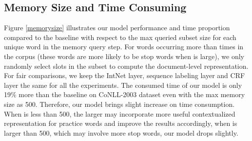 \documentclass[letterpaper]{article} \usepackage{aaai20}  \usepackage{times}  \usepackage{helvet} \usepackage{courier}  \usepackage[hyphens]{url}  \usepackage{graphicx} \urlstyle{rm} \def\UrlFont{\rm}  \usepackage{graphicx}  \frenchspacing  \setlength{\pdfpagewidth}{8.5in}  \setlength{\pdfpageheight}{11in}
\begin{document}
\begin{table}[t!] 
\centering
{}
\caption{Detailed results on the CoNLL-2003 dataset for IV, OOTV, OOEV, OOBV. }
\label{detail}
\end{table}

\subsection{Memory Size and Time Consuming} 
 Figure \ref{memorysize} illustrates our model performance and time proportion compared to the baseline with respect to the max queried subset size  for each unique word in the memory query step. For words occurring more than  times in the corpus (these words are more likely to be stop words when  is large), we only randomly select  slots in the subset to compute the  document-level representation.
For fair comparisons, we keep the IntNet layer, sequence labeling layer and CRF layer the same for all the experiments. The consumed time of our model is only 19\% more than the baseline  on CoNLL-2003 dataset even with the max memory size as 500.
Therefore, our model  brings slight increase on time consumption. 
When  is less than 500, the larger  may incorporate more useful contextualized representation for practice words and improve the results accordingly, when  is larger than 500, which may involve more stop words, our model drops slightly.
\end{document}
